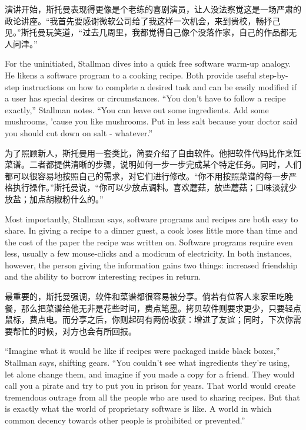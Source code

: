 \ifdefined\chs
演讲开始，斯托曼表现得更像是个老练的喜剧演员，让人没法察觉这是一场严肃的政论讲座。``我首先要感谢微软公司给了我这样一次机会，来到贵校，畅抒己见。''斯托曼玩笑道，``过去几周里，我都觉得自己像个没落作家，自己的作品都无人问津。''
\fi

\ifdefined\eng
For the uninitiated, Stallman dives into a quick free software warm-up analogy. He likens a software program to a cooking recipe. Both provide useful step-by-step instructions on how to complete a desired task and can be easily modified if a user has special desires or circumstances. ``You don't have to follow a recipe exactly,'' Stallman notes. ``You can leave out some ingredients. Add some mushrooms, 'cause you like mushrooms. Put in less salt because your doctor said you should cut down on salt - whatever.''
\fi

\ifdefined\chs
为了照顾新人，斯托曼用一套类比，简要介绍了自由软件。他把软件代码比作烹饪菜谱。二者都提供清晰的步骤，说明如何一步一步完成某个特定任务。同时，人们都可以很容易地按照自己的需求，对它们进行修改。``你不用按照菜谱的每一步严格执行操作。''斯托曼说，``你可以少放点调料。喜欢蘑菇，放些蘑菇；口味淡就少放盐；加点胡椒粉什么的。''
\fi

\ifdefined\eng
Most importantly, Stallman says, software programs and recipes are both easy to share. In giving a recipe to a dinner guest, a cook loses little more than time and the cost of the paper the recipe was written on. Software programs require even less, usually a few mouse-clicks and a modicum of electricity. In both instances, however, the person giving the information gains two things: increased friendship and the ability to borrow interesting recipes in return.
\fi

\ifdefined\chs
最重要的，斯托曼强调，软件和菜谱都很容易被分享。倘若有位客人来家里吃晚餐，那么把菜谱给他无非是花些时间，费点笔墨。拷贝软件则要求更少，只要轻点鼠标，费点电。而分享之后，你则起码有两份收获：增进了友谊；同时，下次你需要帮忙的时候，对方也会有所回报。
\fi

\ifdefined\eng
``Imagine what it would be like if recipes were packaged inside black boxes,'' Stallman says, shifting gears. ``You couldn't see what ingredients they're using, let alone change them, and imagine if you made a copy for a friend. They would call you a pirate and try to put you in prison for years. That world would create tremendous outrage from all the people who are used to sharing recipes. But that is exactly what the world of proprietary software is like. A world in which common decency towards other people is prohibited or prevented.''
\fi

